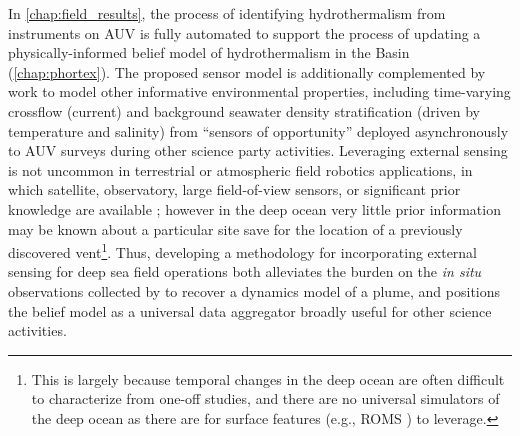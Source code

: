 In \cref{chap:field_results}, the process of identifying hydrothermalism from instruments on AUV \Sentry is fully automated to support the process of updating a physically-informed belief model of hydrothermalism in the Basin (\cref{chap:phortex}).
The proposed sensor model is additionally complemented by work to model other informative environmental properties, including time-varying crossflow (current) and background seawater density stratification (driven by temperature and salinity) from ``sensors of opportunity'' deployed asynchronously to AUV \Sentry surveys during other science party activities.
Leveraging external sensing is not uncommon in terrestrial or atmospheric field robotics applications, in which satellite, observatory, large field-of-view sensors, or significant prior knowledge are available \autocite{everett2019planning,heaney2007nonlinear,desaraju2015vision}; however in the deep ocean very little prior information may be known about a particular site save for the location of a previously discovered vent\footnote{This is largely because temporal changes in the deep ocean are often difficult to characterize from one-off studies, and there are no universal simulators of the deep ocean as there are for surface features (e.g., ROMS \autocite{moore2011regional}) to leverage.}.
Thus, developing a methodology for incorporating external sensing for deep sea field operations both alleviates the burden on the \emph{in situ} observations collected by \Sentry to recover a dynamics model of a plume, and positions the belief model as a universal data aggregator broadly useful for other science activities.



